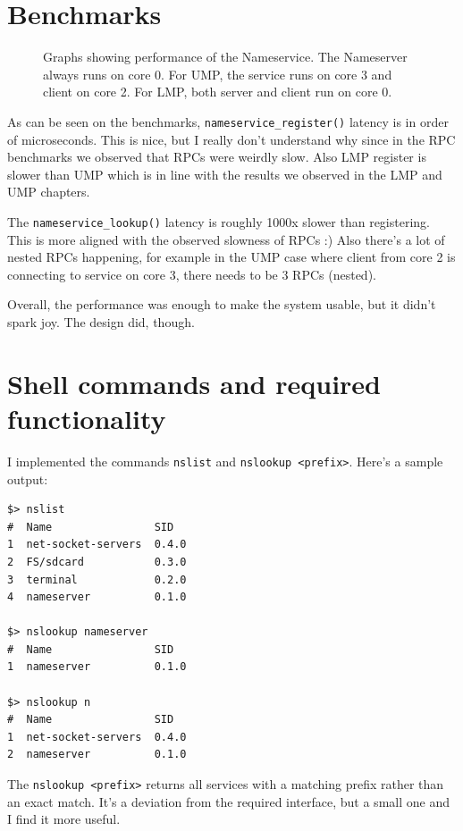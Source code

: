 \section{Benchmarks}
\begin{figure}[ht]
    \centering
         \subfloat[\centering ]{{\scalebox{0.35}{ }}}
         \subfloat[\centering ]{{\scalebox{0.35}{ }}}

    \caption{Graphs showing performance of the Nameservice. The Nameserver always runs on  core 0. For UMP, the service runs on core 3 and client on core 2. For LMP, both server and client run on core 0.}
    \label{fig:ns_bench}
\end{figure}

As can be seen on the benchmarks, \texttt{nameservice_register()} latency is in order of microseconds. This is nice, but I really don't understand why since in the RPC benchmarks we observed that RPCs were weirdly slow. Also LMP register is slower than UMP which is in line with the results we observed in the LMP and UMP chapters.

The \texttt{nameservice_lookup()} latency is roughly 1000x slower than registering. This is more aligned with the observed slowness of RPCs :) Also there's a lot of nested RPCs happening, for example in the UMP case where client from core 2 is connecting to service on core 3, there needs to be 3 RPCs (nested).

Overall, the performance was enough to make the system usable, but it didn't spark joy. The design did, though.

\section{Shell commands and required functionality}
I implemented the commands \texttt{nslist} and \texttt{nslookup <prefix>}. Here's a sample output:
\begin{verbatim}
$> nslist
#  Name                SID
1  net-socket-servers  0.4.0
2  FS/sdcard           0.3.0
3  terminal            0.2.0
4  nameserver          0.1.0

$> nslookup nameserver
#  Name                SID
1  nameserver          0.1.0

$> nslookup n
#  Name                SID
1  net-socket-servers  0.4.0
2  nameserver          0.1.0
\end{verbatim}

The \texttt{nslookup <prefix>} returns all services with a matching prefix rather than an exact match. It's a deviation from the required interface, but a small one and I find it more useful.

